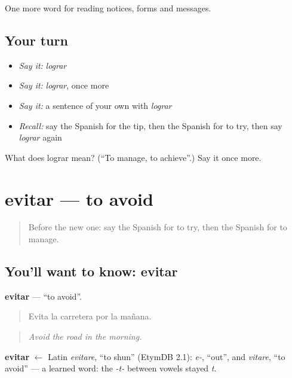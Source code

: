 \begin{grammarlens}[title={What you've built}]
One more word for reading notices, forms and messages.
\end{grammarlens}

\subsection*{Your turn}
\begin{itemize}
\raggedright
  \item \emph{Say it:} \emph{lograr}
  \item \emph{Say it:} \emph{lograr}, once more
  \item \emph{Say it:} a sentence of your own with \emph{lograr}
  \item \emph{Recall:} say the Spanish for the tip, then the Spanish for to try, then say \emph{lograr} again
\end{itemize}

\begin{tcolorbox}[breakable,colback=teal!4,colframe=teal!35!black,title={Before you move on}]
What does lograr mean? (\textquotedblleft{}To manage, to achieve\textquotedblright{}.) Say it once more.
\end{tcolorbox}
\section[evitar]{evitar — to avoid}

\label{lesson:ES-C492-evitar}



\begin{quote}
Before the new one: say the Spanish for to try, then the Spanish for to manage.
\end{quote}

\subsection*{You'll want to know: evitar}
\textbf{evitar} — \textquotedblleft{}to avoid\textquotedblright{}.

\begin{quote}
Evita la carretera por la mañana.
\end{quote}

\begin{quote}
\emph{Avoid the road in the morning.}
\end{quote}

\begin{cousinweb}
\textbf{evitar} $\leftarrow$ Latin \emph{evitare}, \textquotedblleft{}to shun\textquotedblright{} (EtymDB 2.1): \emph{e-}, \textquotedblleft{}out\textquotedblright{}, and \emph{vitare}, \textquotedblleft{}to avoid\textquotedblright{} — a learned word: the \emph{-t-} between vowels stayed \emph{t}.
\end{cousinweb}

